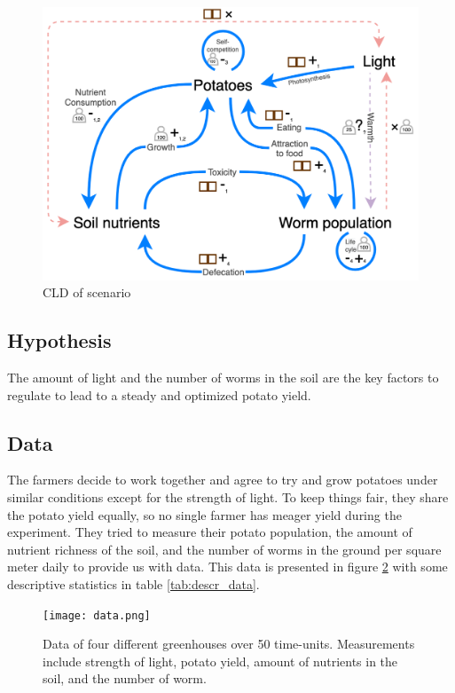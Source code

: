 \documentclass[a4paper]{article}
\begin{document}
\begin{figure}[t]
\centering
\includegraphics[width=0.75\linewidth]{network.png}
\caption{\label{fig:CLD}CLD of scenario}
\end{figure}

\subsection*{Hypothesis}
\label{sec:orgb8fa377}
The amount of light and the number of worms in the soil are the key factors to regulate to lead to a steady and optimized potato yield.

\clearpage
\subsection*{Data}
\label{sec:org1f7acb3}
The farmers decide to work together and agree to try and grow potatoes under similar conditions except for the strength of light. To keep things fair, they share the potato yield equally, so no single farmer has meager yield during the experiment. They tried to measure their potato population, the amount of nutrient richness of the soil, and the number of worms in the ground per square meter daily to provide us with data. This data is presented in figure \ref{fig:data} with some descriptive statistics in table \ref{tab:descr_data}.

\begin{figure}[h]
\centering
\texttt{[image: data.png]}
\caption{\label{fig:data}Data of four different greenhouses over 50 time-units. Measurements include strength of light, potato yield, amount of nutrients in the soil, and the number of worm.}
\end{figure}
\end{document}
